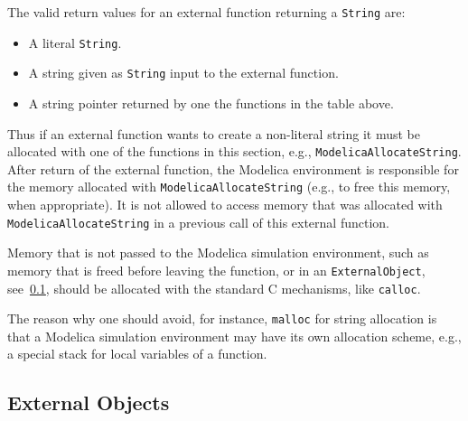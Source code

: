The valid return values for an external function returning a \lstinline!String! are:
\begin{itemize}
\item A literal \lstinline!String!.
\item A string given as \lstinline!String! input to the external function.
\item A string pointer returned by one the functions in the table above.
\end{itemize}

Thus if an external function wants to create a non-literal string it must be allocated with one of the functions in this section, e.g., \lstinline[language=C]!ModelicaAllocateString!.  After return of the external function, the Modelica environment is responsible for the memory allocated with \lstinline[language=C]!ModelicaAllocateString! (e.g., to free this memory, when appropriate).  It is not allowed to access memory that was allocated with \lstinline[language=C]!ModelicaAllocateString! in a previous call of this external function.

\begin{nonnormative}
Memory that is not passed to the Modelica simulation environment, such as memory that is freed before leaving the function, or in an \lstinline!ExternalObject!,
see~\cref{external-objects}, should be allocated with the standard C mechanisms, like \lstinline[language=C]!calloc!.
\end{nonnormative}

\begin{nonnormative}
The reason why one should avoid, for instance, \lstinline[language=C]!malloc! for string allocation is that a Modelica simulation environment may have
its own allocation scheme, e.g., a special stack for local variables of a function.
\end{nonnormative}

\subsection{External Objects}\label{external-objects}

